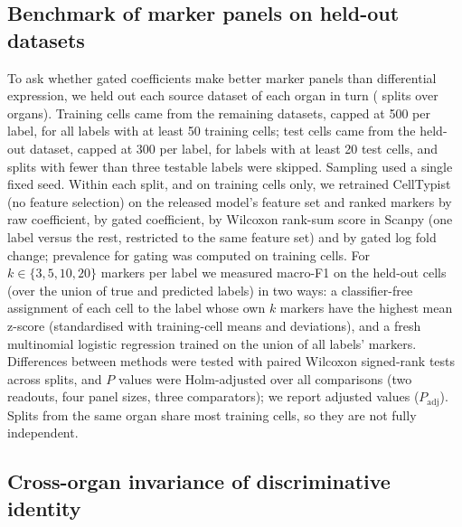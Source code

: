 \documentclass[11pt]{article}
\begin{document}
\subsection{Benchmark of marker panels on held-out datasets}

To ask whether gated coefficients make better marker panels than differential expression, we held out each source dataset of each organ in turn (\pnSplits{} splits over \pnOrgans{} organs). Training cells came from the remaining datasets, capped at 500 per label, for all labels with at least 50 training cells; test cells came from the held-out dataset, capped at 300 per label, for labels with at least 20 test cells, and splits with fewer than three testable labels were skipped. Sampling used a single fixed seed. Within each split, and on training cells only, we retrained CellTypist (no feature selection) on the released model's feature set and ranked markers by raw coefficient, by gated coefficient, by Wilcoxon rank-sum score in Scanpy \cite{wolf2018} (one label versus the rest, restricted to the same feature set) and by gated log fold change; prevalence for gating was computed on training cells. For $k \in \{3, 5, 10, 20\}$ markers per label we measured macro-F1 on the held-out cells (over the union of true and predicted labels) in two ways: a classifier-free assignment of each cell to the label whose own $k$ markers have the highest mean z-score (standardised with training-cell means and deviations), and a fresh multinomial logistic regression \cite{pedregosa2011} trained on the union of all labels' markers. Differences between methods were tested with paired Wilcoxon signed-rank tests across splits, and $P$ values were Holm-adjusted over all \pnNTests{} comparisons (two readouts, four panel sizes, three comparators); we report adjusted values ($P_\mathrm{adj}$). Splits from the same organ share most training cells, so they are not fully independent.

\subsection{Cross-organ invariance of discriminative identity}
\end{document}
